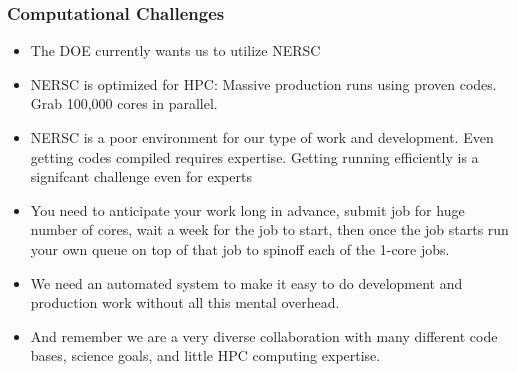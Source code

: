 \documentclass{beamer}
\begin{document}
\frame
{
    \frametitle{Computational Challenges}

 
    \begin{itemize}

        \item The DOE currently wants us to utilize NERSC

        \item NERSC is optimized for HPC: Massive production runs
            using proven codes.  Grab 100,000 cores in parallel.

        \item NERSC is a poor environment for our type of work and development.
            Even getting codes compiled requires expertise.  Getting running
            efficiently is a signifcant challenge even for experts
            
        \item You need to anticipate your work long in advance, submit job for
            huge number of cores, wait a week for the job to start, then once
            the job starts run your own queue on top of that job to spinoff
            each of the 1-core jobs.

        \item We need an automated system to make it easy to do development and
            production work without all this mental overhead.

        \item And remember we are a very diverse collaboration with many
            different code bases, science goals, and little HPC computing
            expertise.

    \end{itemize}

}
\end{document}
